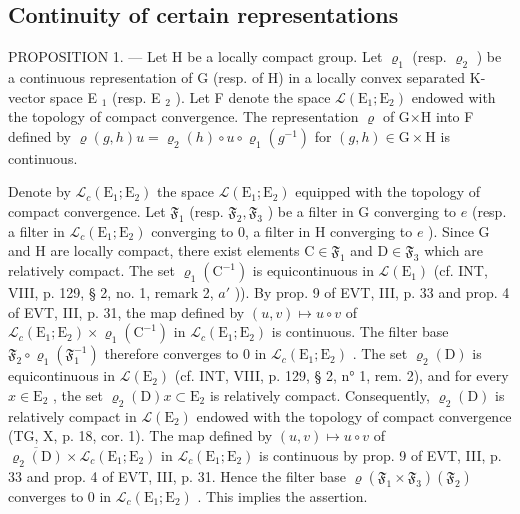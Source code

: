 \subsection{Continuity of certain representations}

PROPOSITION 1. — Let H be a locally compact group. Let \(\varrho_{1}\) (resp. \(\varrho_{2}\) ) be a continuous representation of G (resp. of H) in a locally convex separated K-vector space E \(_{1}\) (resp. E \(_{2}\) ). Let F denote the space \(\mathcal{L}(\mathrm{E}_{1};\mathrm{E}_{2})\) endowed with the topology of compact convergence. The representation \(\varrho\) of G×H into F defined by \(\varrho(g,h)u=\varrho_{2}(h)\circ u\circ\varrho_{1}(g^{-1})\) for \((g,h)\in\mathrm{G}\times\mathrm{H}\) is continuous.

Denote by \(\mathcal{L}_c(\mathrm{E}_1;\mathrm{E}_2)\) the space \(\mathcal{L}(\mathrm{E}_1;\mathrm{E}_2)\) equipped with the topology of compact convergence. Let \(\mathfrak{F}_1\) (resp. \(\mathfrak{F}_2,\mathfrak{F}_3\) ) be a filter in G converging to \(e\) (resp. a filter in \(\mathcal{L}_c(\mathrm{E}_1;\mathrm{E}_2)\) converging to 0, a filter in H converging to \(e\) ). Since G and H are locally compact, there exist elements \(\mathrm{C}\in \mathfrak{F}_1\) and \(\mathrm{D}\in \mathfrak{F}_3\) which are relatively compact. The set \(\varrho_1(\mathrm{C}^{-1})\) is equicontinuous in \(\mathcal{L}(\mathrm{E}_1)\) (cf. INT, VIII, p. 129, § 2, no. 1, remark 2, \(a'\) )). By prop. 9 of EVT, III, p. 33 and prop. 4 of EVT, III, p. 31, the map defined by \((u,v)\mapsto u\circ v\) of \(\mathcal{L}_c(\mathrm{E}_1;\mathrm{E}_2)\times \varrho_1(\mathrm{C}^{-1})\) in \(\mathcal{L}_c(\mathrm{E}_1;\mathrm{E}_2)\) is continuous. The filter base \(\mathfrak{F}_2\circ \varrho_1(\mathfrak{F}_1^{-1})\) therefore converges to 0 in \(\mathcal{L}_c(\mathrm{E}_1;\mathrm{E}_2)\) . The set \(\varrho_2(\mathrm{D})\) is equicontinuous in \(\mathcal{L}(\mathrm{E}_2)\) (cf. INT, VIII, p. 129, § 2, n° 1, rem. 2), and for every \(x\in \mathrm{E}_2\) , the set \(\varrho_2(\mathrm{D})x\subset \mathrm{E}_2\) is relatively compact. Consequently, \(\varrho_2(\mathrm{D})\) is relatively compact in \(\mathcal{L}(\mathrm{E}_2)\) endowed with the topology of compact convergence (TG, X, p. 18, cor. 1). The map defined by \((u,v)\mapsto u\circ v\) of \(\overline{\varrho_2(\mathrm{D})}\times \mathcal{L}_c(\mathrm{E}_1;\mathrm{E}_2)\) in \(\mathcal{L}_c(\mathrm{E}_1;\mathrm{E}_2)\) is continuous by prop. 9 of EVT, III, p. 33 and prop. 4 of EVT, III, p. 31. Hence the filter base \(\varrho (\mathfrak{F}_1\times \mathfrak{F}_3)(\mathfrak{F}_2)\) converges to 0 in \(\mathcal{L}_c(\mathrm{E}_1;\mathrm{E}_2)\) . This implies the assertion.

